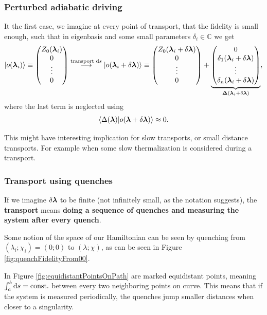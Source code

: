 \subsubsection{Perturbed adiabatic driving}
It the first case, we imagine at every point of transport, that the fidelity is small enough, such that in eigenbasis and some small parameters $\delta_i\in \mathbb{C}$ we get
$$\ket{o({\bm\lambda}_i)}\equiv \begin{pmatrix}
    Z_0({\bm\lambda}_i)\\
    0\\
    \vdots \\
    0
\end{pmatrix} \overset{\text{transport }\mathrm{d} s}{\longrightarrow} \ket{o({\bm\lambda}_i+\delta {\bm\lambda})}\equiv\begin{pmatrix}
    Z_0({\bm\lambda}_i+\delta {\bm\lambda})\\
    0\\
    \vdots \\
    0
\end{pmatrix} +\underbrace{\begin{pmatrix}
    0\\
    \delta_1({\bm\lambda}_i+\delta {\bm\lambda})\\
    \vdots \\
    \delta_n({\bm\lambda}_i+\delta {\bm\lambda})
\end{pmatrix}}_{\mathbf{\Delta}({\bm\lambda}_i+\delta {\bm\lambda})}, $$
where the last term is neglected using 
$$\braket{\Delta({\bm\lambda})|o({\bm\lambda}+\delta{\bm\lambda})}\approx 0.$$

This might have interesting implication for slow transports, or small distance transports. For example when some slow thermalization is considered during a transport.



\subsubsection{Transport using quenches}
If we imagine $\delta{\bm\lambda}$ to be finite (not infinitely small, as the notation suggests), the \textbf{transport} means \textbf{doing a sequence of quenches and measuring the system after every quench}.


Some notion of the space of our Hamiltonian can be seen by quenching from $(\lambda_i;\chi_i)=(0;0)$ to $(\lambda;\chi)$, as can be seen in Figure \ref{fig:quenchFidelityFrom00}.

In Figure \ref{fig:equidistantPointsOnPath} are marked equidistant points, meaning $\int_a^b \mathrm{d} s=\text{const.}$ between every two neighboring points on curve. This means that if the system is measured periodically, the quenches jump smaller distances when closer to a singularity.

